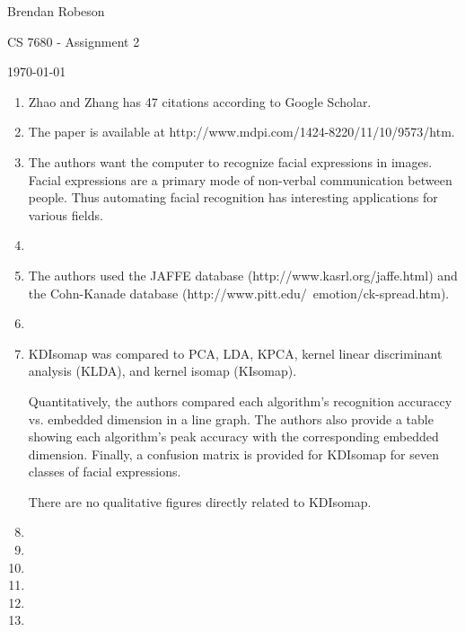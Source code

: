 \documentclass[11pt]{article}
\begin{document}
\noindent Brendan Robeson

\noindent CS 7680 - Assignment 2

\noindent \today

\medskip

\begin{enumerate}
    \item Zhao and Zhang \cite{s111009573} has 47 citations according to Google
        Scholar.

    \item The paper is available at
        http://www.mdpi.com/1424-8220/11/10/9573/htm.

    \item The authors want the computer to recognize facial expressions in images. Facial expressions are a primary mode of non-verbal communication between people. Thus automating facial recognition has interesting applications for various fields.

    \item 

    \item The authors used the JAFFE database (http://www.kasrl.org/jaffe.html) and the Cohn-Kanade database (http://www.pitt.edu/~emotion/ck-spread.htm).

    \item 

    \item KDIsomap was compared to PCA, LDA, KPCA, kernel linear discriminant analysis (KLDA), and kernel isomap (KIsomap).
    
    Quantitatively, the authors compared each algorithm's recognition accuraccy vs. embedded dimension in a line graph. The authors also provide a table showing each algorithm's peak accuracy with the corresponding embedded dimension. Finally, a confusion matrix is provided for KDIsomap for seven classes of facial expressions.
    
    There are no qualitative figures directly related to KDIsomap.
    
    \item 
    \item 
    \item 
    \item 
    \item 
    \item 
\end{enumerate}



\end{document}
